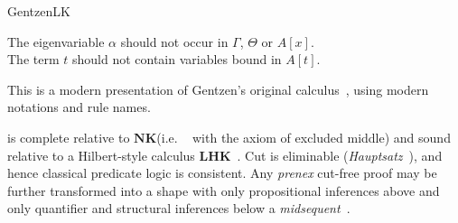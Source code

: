 \begin{entry}{GentzenLK}
\begin{calculus}
\centering
The eigenvariable $\alpha$ should not occur in $\Gamma$, $\Theta$ or $A[x]$. \\ 
The term $t$ should not contain variables bound in $A[t]$.
\end{calculus}


\begin{history}
This is a modern presentation of Gentzen's original \LK
calculus~\cite{lk:Gentzen1935}, using modern notations and rule names.
\end{history}

\newcommand{\LHK}{\ensuremath{\mathbf{LHK}}\xspace}
\newcommand{\NK}{\ensuremath{\mathbf{NK}}\xspace}


\begin{technicalities}
\LK is complete relative to \NK (i.e. \NJ~ with the axiom of
excluded middle) and sound relative to a Hilbert-style calculus
\LHK~\cite{lk:Gentzen1935a}. Cut is eliminable
(\emph{Hauptsatz}~\cite{lk:Gentzen1935}), and hence classical predicate logic is
consistent. Any \emph{prenex} cut-free proof may be further transformed into a
shape with only propositional inferences above and only quantifier and
structural inferences below a \emph{midsequent}~\cite{lk:Gentzen1935a}.
\end{technicalities}

\end{entry}

